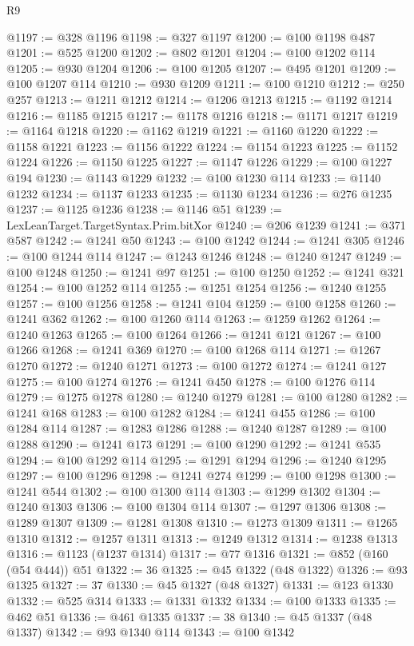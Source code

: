 \begin{lexlean}{R9}
\begin{coremodule}
{{{{{{{{{{{{{{{{{{{{{{{{{{{{{{{{{{{{{{{{{{{{{{{{{{{{{{{{{{{{{{{{{{{{{{{{{{{{{{{{{{{{{{{{{{{{{{{{{{{{{{{{{{{{@1197 := @328 @1196
@1198 := @327 @1197
@1200 := @100 @1198 @487
@1201 := @525 @1200
@1202 := @802 @1201
@1204 := @100 @1202 @114
@1205 := @930 @1204
@1206 := @100 @1205
@1207 := @495 @1201
@1209 := @100 @1207 @114
@1210 := @930 @1209
@1211 := @100 @1210
@1212 := @250 @257
@1213 := @1211 @1212
@1214 := @1206 @1213
@1215 := @1192 @1214
@1216 := @1185 @1215
@1217 := @1178 @1216
@1218 := @1171 @1217
@1219 := @1164 @1218
@1220 := @1162 @1219
@1221 := @1160 @1220
@1222 := @1158 @1221
@1223 := @1156 @1222
@1224 := @1154 @1223
@1225 := @1152 @1224
@1226 := @1150 @1225
@1227 := @1147 @1226
@1229 := @100 @1227 @194
@1230 := @1143 @1229
@1232 := @100 @1230 @114
@1233 := @1140 @1232
@1234 := @1137 @1233
@1235 := @1130 @1234
@1236 := @276 @1235
@1237 := @1125 @1236
@1238 := @1146 @51
@1239 := LexLeanTarget.TargetSyntax.Prim.bitXor
@1240 := @206 @1239
@1241 := @371 @587
@1242 := @1241 @50
@1243 := @100 @1242
@1244 := @1241 @305
@1246 := @100 @1244 @114
@1247 := @1243 @1246
@1248 := @1240 @1247
@1249 := @100 @1248
@1250 := @1241 @97
@1251 := @100 @1250
@1252 := @1241 @321
@1254 := @100 @1252 @114
@1255 := @1251 @1254
@1256 := @1240 @1255
@1257 := @100 @1256
@1258 := @1241 @104
@1259 := @100 @1258
@1260 := @1241 @362
@1262 := @100 @1260 @114
@1263 := @1259 @1262
@1264 := @1240 @1263
@1265 := @100 @1264
@1266 := @1241 @121
@1267 := @100 @1266
@1268 := @1241 @369
@1270 := @100 @1268 @114
@1271 := @1267 @1270
@1272 := @1240 @1271
@1273 := @100 @1272
@1274 := @1241 @127
@1275 := @100 @1274
@1276 := @1241 @450
@1278 := @100 @1276 @114
@1279 := @1275 @1278
@1280 := @1240 @1279
@1281 := @100 @1280
@1282 := @1241 @168
@1283 := @100 @1282
@1284 := @1241 @455
@1286 := @100 @1284 @114
@1287 := @1283 @1286
@1288 := @1240 @1287
@1289 := @100 @1288
@1290 := @1241 @173
@1291 := @100 @1290
@1292 := @1241 @535
@1294 := @100 @1292 @114
@1295 := @1291 @1294
@1296 := @1240 @1295
@1297 := @100 @1296
@1298 := @1241 @274
@1299 := @100 @1298
@1300 := @1241 @544
@1302 := @100 @1300 @114
@1303 := @1299 @1302
@1304 := @1240 @1303
@1306 := @100 @1304 @114
@1307 := @1297 @1306
@1308 := @1289 @1307
@1309 := @1281 @1308
@1310 := @1273 @1309
@1311 := @1265 @1310
@1312 := @1257 @1311
@1313 := @1249 @1312
@1314 := @1238 @1313
@1316 := @1123 (@1237 @1314)
@1317 := @77 @1316
@1321 := @852 (@160 (@54 @444)) @51
@1322 := 36
@1325 := @45 @1322 (@48 @1322)
@1326 := @93 @1325
@1327 := 37
@1330 := @45 @1327 (@48 @1327)
@1331 := @123 @1330
@1332 := @525 @314
@1333 := @1331 @1332
@1334 := @100 @1333
@1335 := @462 @51
@1336 := @461 @1335
@1337 := 38
@1340 := @45 @1337 (@48 @1337)
@1342 := @93 @1340 @114
@1343 := @100 @1342
}}}}}}}}}}}}}}}}}}}}}}}}}}}}}}}}}}}}}}}}}}}}}}}}}}}}}}}}}}}}}}}}}}}}}}}}}}}}}}}}}}}}}}}}}}}}}}}}}}}}}}}}}}}}
\end{coremodule}
\end{lexlean}
